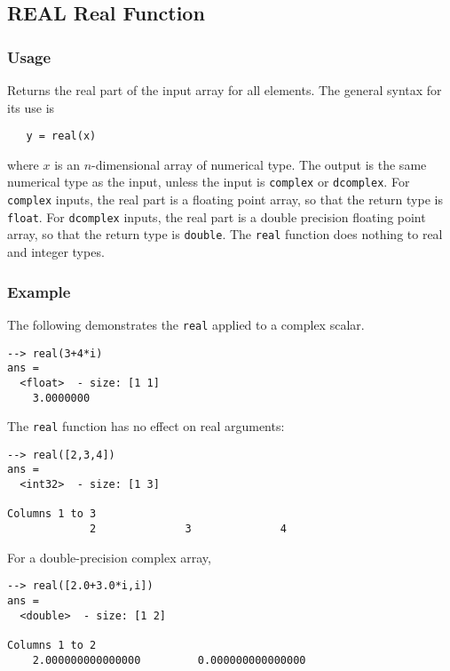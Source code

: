 %
%
%
\subsection{REAL Real Function}
\subsubsection{Usage}
Returns the real part of the input array for all elements.  The 
general syntax for its use is
\begin{verbatim}
   y = real(x)
\end{verbatim}
where $x$ is an $n$-dimensional array of numerical type.  The output 
is the same numerical type as the input, unless the input is \verb|complex|
or \verb|dcomplex|.  For \verb|complex| inputs, the real part is a floating
point array, so that the return type is \verb|float|.  For \verb|dcomplex|
inputs, the real part is a double precision floating point array, so that
the return type is \verb|double|.  The \verb|real| function does
nothing to real and integer types.
\subsubsection{Example}
The following demonstrates the \verb|real| applied to a complex scalar.
\begin{verbatim}
--> real(3+4*i)
ans =
  <float>  - size: [1 1]
    3.0000000
\end{verbatim}
The \verb|real| function has no effect on real arguments:
\begin{verbatim}
--> real([2,3,4])
ans =
  <int32>  - size: [1 3]
  
Columns 1 to 3
             2              3              4
\end{verbatim}
For a double-precision complex array,
\begin{verbatim}
--> real([2.0+3.0*i,i])
ans =
  <double>  - size: [1 2]
  
Columns 1 to 2
    2.000000000000000         0.000000000000000
\end{verbatim}
